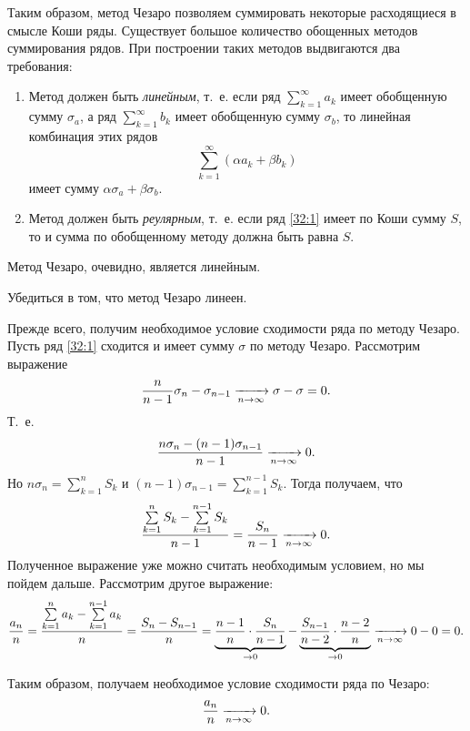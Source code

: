 \documentclass[../../main.tex]{subfiles}
\begin{document}
Таким образом, метод Чезаро позволяем суммировать некоторые расходящиеся в 
смысле Коши ряды. Существует большое количество обощенных методов суммирования 
рядов. При построении таких методов выдвигаются два требования:
\begin{enumerate}
 \item Метод должен быть \emph{линейным}, т.~е. если ряд 
 $\sum\limits_{k=1}^\infty a_k$ имеет обобщенную сумму $\sigma_a$, а ряд 
 $\sum\limits_{k=1}^\infty b_k$ имеет обобщенную сумму $\sigma_b$, то линейная 
 комбинация этих рядов \[\sum\limits_{k=1}^\infty (\alpha a_k + \beta b_k)\] 
 имеет сумму $\alpha\sigma_a + \beta\sigma_b$.
 \item Метод должен быть \emph{реулярным}, т.~е. если ряд \eqref{32:1} имеет 
 по Коши сумму $S$, то и сумма по обобщенному методу должна быть равна $S$.
\end{enumerate}

Метод Чезаро, очевидно, является линейным.

\begin{exc}
 Убедиться в том, что метод Чезаро линеен.
\end{exc}

Прежде всего, получим необходимое условие сходимости ряда по методу Чезаро. 
Пусть ряд \eqref{32:1} сходится и имеет сумму $\sigma$ по методу Чезаро. 
Рассмотрим выражение
\[\frac{n}{n-1}\sigma_n - \sigma_{n-1} \xrightarrow[n\to\infty]{} \sigma - \sigma = 
0.\] Т.~е. \[\frac{n\sigma_n - (n-1)\sigma_{n-1}}{n-1} \xrightarrow[n\to\infty]{} 0.\] 
Но $n\sigma_n = \sum\limits_{k=1}^n S_k$ и $(n-1)\sigma_{n-1} = 
\sum\limits_{k=1}^{n-1} S_k$. Тогда получаем, что
\[\frac{\sum\limits_{k=1}^n S_k - \sum\limits_{k=1}^{n-1} S_k}{n-1} = 
\frac{S_n}{n-1} \xrightarrow[n\to\infty]{} 0.\]
Полученное выражение уже можно считать необходимым условием, но мы пойдем 
дальше. Рассмотрим другое выражение: \[\frac{a_n}n = \frac{\sum\limits_{k=1}^n 
a_k - \sum\limits_{k=1}^{n-1} a_k}n = \frac{S_n - S_{n-1}}n  = 
\underbrace{\frac{n-1}n\cdot\frac{S_n}{n-1}}_{\to0} - 
\underbrace{\frac{S_{n-1}}{n-2}\cdot\frac{n-2}n}_{\to0} \xrightarrow[n\to\infty]{} 0-0 
= 0.\]

Таким образом, получаем необходимое условие сходимости ряда по Чезаро: 
\[\frac{a_n}n \xrightarrow[n\to\infty]{} 0.\]
\end{document}

